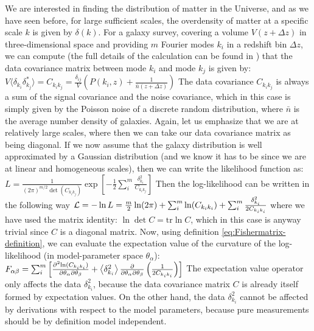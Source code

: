 We are interested in finding the distribution of matter in the Universe, and as we have seen before,
for large sufficient scales, the overdensity of matter at a specific scale $k$ is given by $\delta(k)$.
For a galaxy survey, covering a volume $V(z+ \Delta z)$ in three-dimensional space and providing
$m$ Fourier modes $k_i$ in a redshift bin $\Delta z$, 
we can compute (the full details of the calculation can be found in \cite{cite Dodelson})
that the data covariance matrix between mode $k_i$ and mode $k_j$ is given by:
\beeq$\label{eq:dataCovariancePk}
V \langle\delta_{k_i} \delta^*_{k_j} \rangle = C_{k_{i} k_{j}} = \frac{\delta_{ij}}{V} \left( P(k_i, z) + \frac{1}{\bar{n}(z+\Delta z)} \right)
$
The data covariance $C_{k_{i} k_{j}}$ is always a sum of the signal covariance and the noise covariance, which 
in this case is simply given by the Poisson noise of a discrete random distribution, where $\bar n$ is the 
average number density of galaxies. Again, let us emphasize that we are at relatively large scales, where then
we can take our data covariance matrix as being diagonal.
If we now assume that the galaxy distribution is well approximated by a Gaussian distribution (and we 
know it has to be since we are at linear and homogeneous scales), then we can
write the likelihood function as:
\beeq$\label{eq:likelihood-Pofk}
L=\frac{1}{(2\pi)^{m/2} \det (C_{k_{i} k_{j}}) } \exp \left[-\frac{1}{2}\sum_{i}^{m} 
\frac{\delta^2_{k_i}}{C_{k_{i} k_{j}}} \right] $
Then the log-likelihood can be written in the following way
\beeq$\label{eq:loglik-Pk}
\mathcal{L} = -\ln L = \frac{m}{2} \ln(2\pi) + \sum_{i}^{m}\ln(C_{k_{i} k_{i}}) + \sum_{i}^{m}\frac{\delta^2_{k_i}}{2 C_{k_{i} k_{i}}}
$
where we have used the matrix identity: $\ln \det C = \mathrm{tr} \ln C$, which in this case is anyway trivial since $C$ is a diagonal matrix.
Now, using definition \ref{eq:Fishermatrix-definition}, we can evaluate the expectation value of the 
curvature of the log-likelihood (in model-parameter space $\theta_{\alpha}$):
\beeq$\label{eq:Fisher-fromloglik}
F_{\alpha \beta} = \sum_{i}^{m} \left[ \frac{\partial^2{\ln(C_{k_{i} k_{i}})}}{\partial{\theta_{\alpha}}\partial{\theta_{\beta}}} + 
\left\langle \delta^2_{k_i} \right\rangle \frac{\partial}{\partial{\theta_{\alpha}}\partial{\theta_{\beta}}}\left(\frac{1}{2  C_{k_{i} k_{i}}} \right) \right] 
$
The expectation value operator only affects the data $\delta^2_{k_i}$, because the data covariance matrix $C$ is 
already itself formed by expectation values. On the other hand, the data $\delta^2_{k_i}$ cannot be affected by
derivations with respect to the model parameters, because pure measurements should be by definition model independent.
